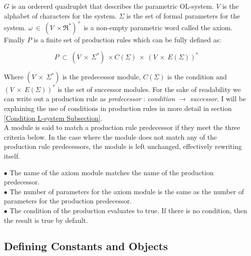 \begin{flushleft}
$G$ is an ordererd quadruplet that describes the parametric OL-system. $V$ is the alphabet of characters for the system. $\Sigma$ is the set of formal parameters for the system. $\omega~ \in~ (V~ \times \Re^*)^+$ is a non-empty parametric word called the axiom. Finally $P$ is a finite set of production rules which can be fully defined as:

\vspace{5mm}

\begin{equation}
P~ \subset~ (V~ \times~ \Sigma^*)~ \times C(\Sigma)~ \times~ (V~ \times~ E(\Sigma))^*
\end{equation}

\vspace{5mm} 

Where $(V~ \times~ \Sigma^*) $ is the predecessor module, $C(\Sigma) $ is the condition and $(V~ \times~ E(\Sigma))^* $ is the set of successor modules. For the sake of readability we can write out a production rule as \textit{predecessor} : \textit{condition} $\rightarrow$ \textit{successor}. I will be explaining the use of conditions in production rules in more detail in section \ref{Condition L-system Subsection}.\\
A module is said to match a production rule predecessor if they meet the three criteria below. In the case where the module does not match any of the production rule predecessors, the module is left unchanged, effectively rewriting itself. \\

\vspace{5mm}

$\bullet$ The name of the axiom module matches the name of the production predecessor. \\
$\bullet$ The number of parameters for the axiom module is the same as the number of parameters for the production predecessor. \\
$\bullet$ The condition of the production evaluates to true. If there is no condition, then the result is true by default.\\

\vspace{5mm}

\end{flushleft}

\subsection{Defining Constants and Objects}

